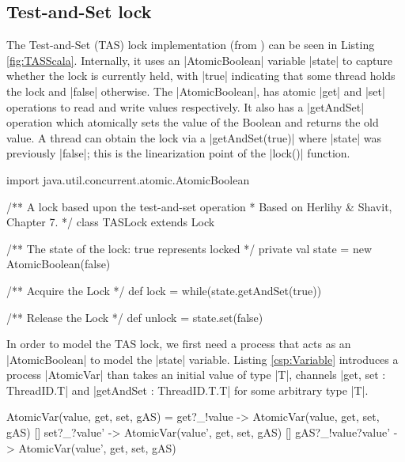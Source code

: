 \subsection{Test-and-Set lock}

The Test-and-Set (TAS) lock implementation (from \cite{CADS}) can be seen in Listing \ref{fig:TASScala}. Internally, it uses an |AtomicBoolean| variable |state| to capture whether the lock is currently held, with |true| indicating that some thread holds the lock and |false| otherwise. The |AtomicBoolean|, has atomic |get| and |set| operations to read and write values respectively. It also has a |getAndSet| operation which atomically sets the value of the Boolean and returns the old value. A thread can obtain the lock via a |getAndSet(true)| where |state| was previously |false|; this is the linearization point of the |lock()| function. %


  \begin{scala}[caption={Test-and-set lock from \cite{CADS}}, label={fig:TASScala}]
import java.util.concurrent.atomic.AtomicBoolean

/** A lock based upon the test-and-set operation 
  * Based on Herlihy & Shavit, Chapter 7. */
class TASLock extends Lock{
  /** The state of the lock: true represents locked */
  private val state = new AtomicBoolean(false)

  /** Acquire the Lock */ 
  def lock = while(state.getAndSet(true)){ }

  /** Release the Lock */
  def unlock = state.set(false)
}
  \end{scala}

\inlineCSP

In order to model the TAS lock, we first need a process that acts as an |AtomicBoolean| to model the |state| variable. Listing \ref{csp:Variable} introduces a process |AtomicVar| than takes an initial value of type |T|, channels |get, set : ThreadID.T| and |getAndSet : ThreadID.T.T| for some arbitrary type |T|.

  \begin{cspm}[caption={A process encapsulating an Atomic variable with get, set and getAndSet operations},label={csp:Variable}]
AtomicVar(value, get, set, gAS) = 
     get?_!value -> AtomicVar(value, get, set, gAS)
  [] set?_?value' -> AtomicVar(value', get, set, gAS)
  [] gAS?_!value?value' -> AtomicVar(value', get, set, gAS) 
  \end{cspm}

